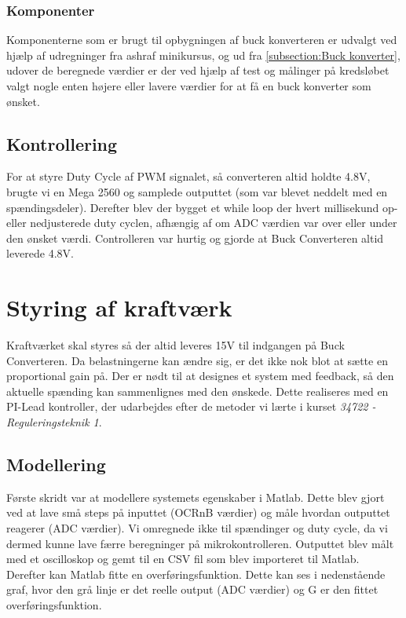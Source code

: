 \documentclass[../main.tex]{subfiles}
\begin{document}
\subsubsection{Komponenter}
Komponenterne som er brugt til opbygningen af buck konverteren er udvalgt ved hjælp af udregninger fra ashraf minikursus, og ud fra \ref{subsection:Buck konverter}, udover de beregnede værdier er der ved hjælp af test og målinger på kredsløbet valgt nogle enten højere eller lavere værdier for at få en buck konverter som ønsket.

\subsection{Kontrollering}
For at styre Duty Cycle af PWM signalet, så converteren altid holdte 4.8V, brugte vi en Mega 2560 og samplede outputtet (som var blevet neddelt med en spændingsdeler). Derefter blev der bygget et while loop der hvert millisekund op- eller nedjusterede duty cyclen, afhængig af om ADC værdien var over eller under den ønsket værdi. Controlleren var hurtig og gjorde at Buck Converteren altid leverede 4.8V. 

\section{Styring af kraftværk}
Kraftværket skal styres så der altid leveres 15V til indgangen på Buck Converteren. Da belastningerne kan ændre sig, er det ikke nok blot at sætte en proportional gain på. Der er nødt til at designes et system med feedback, så den aktuelle spænding kan sammenlignes med den ønskede. Dette realiseres med en PI-Lead kontroller, der udarbejdes efter de metoder vi lærte i kurset \emph{34722 - Reguleringsteknik 1}.

\subsection{Modellering}
Første skridt var at modellere systemets egenskaber i Matlab. Dette blev gjort ved at lave små steps på inputtet (OCRnB værdier) og måle hvordan outputtet reagerer (ADC værdier). Vi omregnede ikke til spændinger og duty cycle, da vi dermed kunne lave færre beregninger på mikrokontrolleren. Outputtet blev målt med et oscilloskop og gemt til en CSV fil som blev importeret til Matlab. Derefter kan Matlab fitte en overføringsfunktion. Dette kan ses i nedenstående graf, hvor den grå linje er det reelle output (ADC værdier) og G er den fittet overføringsfunktion. 
\end{document}
